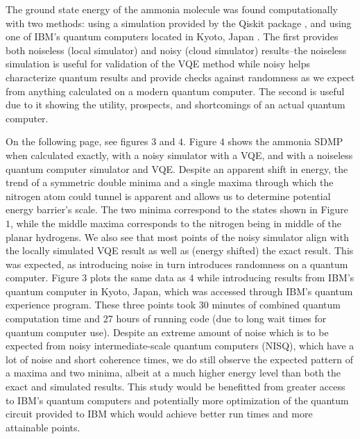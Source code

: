 \documentclass[10pt,twocolumn,letterpaper]{article}
\begin{document}
The ground state energy of the ammonia molecule was found computationally with two methods: using a simulation provided by the Qiskit package \cite{Qiskit}, and using one of IBM's quantum computers located in Kyoto, Japan \cite{ibm}. The first provides both noiseless (local simulator) and noisy (cloud simulator) results--the noiseless simulation is useful for validation of the VQE method while noisy helps characterize quantum results and provide checks against randomness as we expect from anything calculated on a modern quantum computer. The second is useful due to it showing the utility, prospects, and shortcomings of an actual quantum computer. 

On the following page, see figures $3$ and $4$. Figure $4$ shows the ammonia SDMP when calculated exactly, with a noisy simulator with a VQE, and with a noiseless quantum computer simulator and VQE. Despite an apparent shift in energy, the trend of a symmetric double minima and a single maxima through which the nitrogen atom could tunnel is apparent and allows us to determine potential energy barrier's scale. The two minima correspond to the states shown in Figure $1$, while the middle maxima corresponds to the nitrogen being in middle of the planar hydrogens. We also see that most points of the noisy simulator align with the locally simulated VQE result as well as (energy shifted) the exact result. This was expected, as introducing noise in turn introduces randomness on a quantum computer. Figure $3$ plots the same data as $4$ while introducing results from IBM's quantum computer in Kyoto, Japan, which was accessed through IBM's quantum experience program. These three points took 30 minutes of combined quantum computation time and 27 hours of running code (due to long wait times for quantum computer use). Despite an extreme amount of noise which is to be expected from noisy intermediate-scale quantum computers (NISQ), which have a lot of noise and short coherence times, we do still observe the expected pattern of a maxima and two minima, albeit at a much higher energy level than both the exact and simulated results. This study would be benefitted from greater access to IBM's quantum computers and potentially more optimization of the quantum circuit provided to IBM which would achieve better run times and more attainable points.
\end{document}
